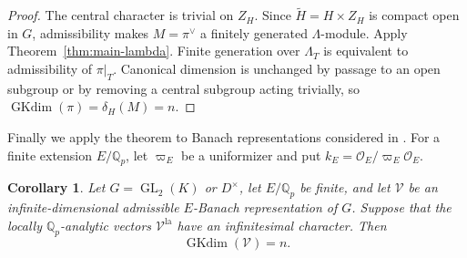 \documentclass[11pt]{article}
\numberwithin{equation}{section}
\newtheorem{corollary}[theorem]{Corollary}
\theoremstyle{definition}
\theoremstyle{remark}
\newcommand{\Q}{\mathbb Q}
\newcommand{\cO}{\mathcal O}
\DeclareMathOperator{\GL}{GL}
\DeclareMathOperator{\GKdim}{GKdim}
\begin{document}
\begin{proof}
The central character is trivial on $Z_H$. Since
$\widetilde H=H\times Z_H$ is compact open in $G$, admissibility makes
$M=\pi^\vee$ a finitely generated $\Lambda$-module.
Apply Theorem~\ref{thm:main-lambda}. Finite generation over $\Lambda_T$
is equivalent to admissibility of $\pi|_T$. Canonical dimension is unchanged by passage to
an open subgroup or by removing a central subgroup acting
trivially, so $\GKdim(\pi)=\delta_H(M)=n$.
\end{proof}

Finally we apply the theorem to Banach representations considered in \cite{Sor26b}. For a finite
extension $E/\Q_p$, let $\varpi_E$ be a uniformizer and put
$k_E=\cO_E/\varpi_E\cO_E$.

\begin{corollary}\label{cor:banach-gk-dimension}
Let $G=\GL_2(K)$ or $D^\times$, let $E/\Q_p$ be finite, and
let $\mathcal V$ be an infinite-dimensional admissible
$E$-Banach representation of $G$. Suppose that the locally
$\Q_p$-analytic vectors $\mathcal V^{\mathrm{la}}$ have an
infinitesimal character. Then
\[
 \GKdim(\mathcal V)=n.
\]
\end{corollary}
\end{document}
